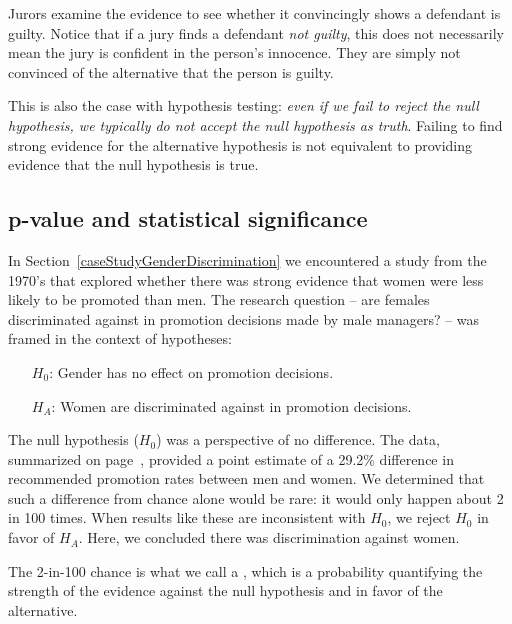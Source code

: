 Jurors examine the evidence to see whether it convincingly shows a defendant is guilty. Notice that if a jury finds a defendant \emph{not guilty}, this does not necessarily mean the jury is confident in the person's innocence. They are simply not convinced of the alternative that the person is guilty.

This is also the case with hypothesis testing: \emph{even if we fail to reject the null hypothesis, we typically do not accept the null hypothesis as truth}. Failing to find strong evidence for the alternative hypothesis is not equivalent to providing evidence that the null hypothesis is true.


\subsection{p-value and statistical significance} %

In Section~\ref{caseStudyGenderDiscrimination} we encountered a study from the 1970's that explored whether there was strong evidence that women were less likely to be promoted than men. The research question -- are females discriminated against in promotion decisions made by male managers? -- was framed in the context of hypotheses:
\begin{itemize}
\setlength{\itemsep}{0mm}
\item[$H_0$:] Gender has no effect on promotion decisions.
\item[$H_A$:] Women are discriminated against in promotion decisions.
\end{itemize}
The null hypothesis ($H_0$) was a perspective of no difference. The data, summarized on page~\pageref{discriminationResults}, provided a point estimate of a 29.2\% difference in recommended promotion rates between men and women. We determined that such a difference from chance alone would be rare: it would only happen about 2 in 100 times. When results like these are inconsistent with $H_0$, we reject $H_0$ in favor of $H_A$. Here, we concluded there was discrimination against women.

The 2-in-100 chance is what we call a , which is a probability quantifying the strength of the evidence against the null hypothesis and in favor of the alternative. %

